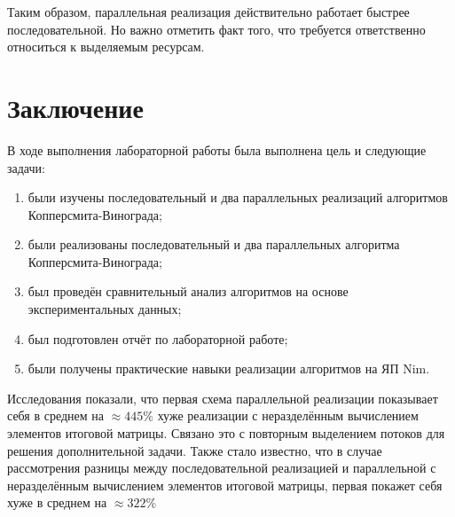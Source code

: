 \documentclass[12pt]{report}
\begin{document}
Таким образом, параллельная реализация действительно работает быстрее последовательной. Но важно отметить факт того, что требуется ответственно относиться к выделяемым ресурсам.

\chapter*{Заключение}
В ходе выполнения лабораторной работы была выполнена цель и следующие задачи:
\begin{enumerate}
\item были изучены последовательный и два параллельных реализаций алгоритмов Копперсмита-Винограда;
\item были реализованы последовательный и два параллельных алгоритма Копперсмита-Винограда;
\item был проведён сравнительный анализ алгоритмов на основе экспериментальных данных;
\item был подготовлен отчёт по лабораторной работе;
\item были получены практические навыки реализации алгоритмов на ЯП Nim.
\end{enumerate}

Исследования показали, что первая схема параллельной реализации показывает себя в среднем на $\approx 445\%$ хуже реализации с неразделённым вычислением элементов итоговой матрицы. Связано это с повторным выделением потоков для решения дополнительной задачи. Также стало известно, что в случае рассмотрения разницы между последовательной реализацией и параллельной с неразделённым вычислением элементов итоговой матрицы, первая покажет себя хуже в среднем на $\approx 322\%$

\end{document}
